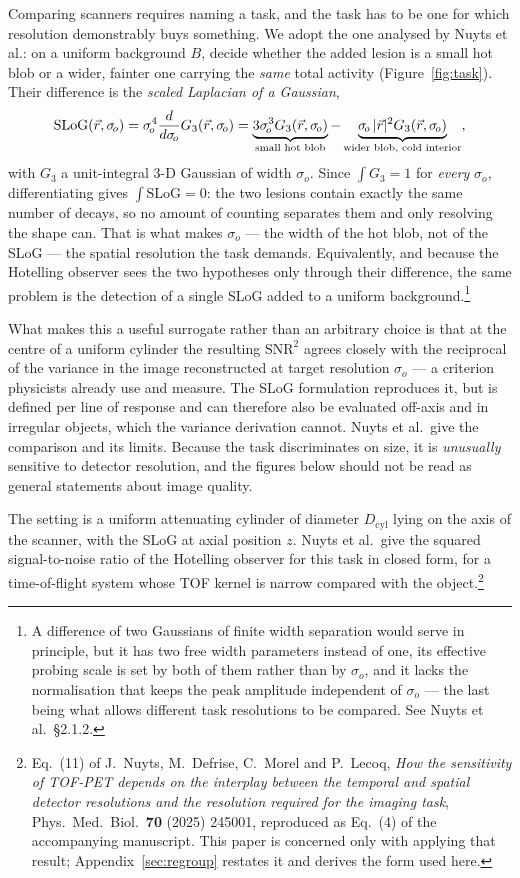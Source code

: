 \documentclass[11pt,a4paper]{article}
\newcommand{\Dcyl}{D_{\mathrm{cyl}}}
\newcommand{\so}{\sigma_{\!o}}
\DeclarePairedDelimiter{\abs}{\lvert}{\rvert}
\begin{document}
Comparing scanners requires naming a task, and the task has to be one for which resolution
demonstrably buys something. We adopt the one analysed by Nuyts et al.: on a uniform
background $B$, decide whether the added lesion is a small hot blob or a wider, fainter one
carrying the \emph{same} total activity (Figure~\ref{fig:task}). Their difference is the
\emph{scaled Laplacian of a Gaussian},
\begin{equation}
  \mathrm{SLoG}(\vec r,\so)=\so^{4}\frac{d}{d\so}G_3(\vec r,\so)
   =\underbrace{3\so^{3}G_3(\vec r,\so)}_{\text{small hot blob}}
    -\underbrace{\so\,\abs{\vec r}^{2}G_3(\vec r,\so)}_{\text{wider blob, cold interior}},
  \label{eq:slog}
\end{equation}
with $G_3$ a unit-integral $3$-D Gaussian of width $\so$. Since $\int G_3=1$ for \emph{every}
$\so$, differentiating gives $\int\mathrm{SLoG}=0$: the two lesions contain exactly the same
number of decays, so no amount of counting separates them and only resolving the shape can.
That is what makes $\so$ --- the width of the hot blob, not of the SLoG --- the spatial
resolution the task demands. Equivalently, and because the Hotelling observer sees the two
hypotheses only through their difference, the same problem is the detection of a single SLoG
added to a uniform background.\footnote{A difference of two Gaussians of finite width
separation would serve in principle, but it has two free width parameters instead of one,
its effective probing scale is set by both of them rather than by $\so$, and it lacks the
normalisation that keeps the peak amplitude independent of $\so$ --- the last being what
allows different task resolutions to be compared. See Nuyts et al.\ \S2.1.2.}

What makes this a useful surrogate rather than an arbitrary choice is that at the centre of a
uniform cylinder the resulting $\mathrm{SNR}^{2}$ agrees closely with the reciprocal of the
variance in the image reconstructed at target resolution $\so$ --- a criterion physicists
already use and measure. The SLoG formulation reproduces it, but is defined per line of
response and can therefore also be evaluated off-axis and in irregular objects, which the
variance derivation cannot. Nuyts et al.\ give the comparison and its limits. Because the
task discriminates on size, it is \emph{unusually} sensitive to detector resolution, and the
figures below should not be read as general statements about image quality.

The setting is a uniform attenuating cylinder of diameter $\Dcyl$ lying on the axis of the
scanner, with the SLoG at axial position $z$. Nuyts et al.\ give the squared signal-to-noise
ratio of the Hotelling observer for this task in closed form, for a time-of-flight system
whose TOF kernel is narrow compared with the object.\footnote{Eq.~(11) of J.~Nuyts,
M.~Defrise, C.~Morel and P.~Lecoq, \emph{How the sensitivity of TOF-PET depends on the
interplay between the temporal and spatial detector resolutions and the resolution required
for the imaging task}, Phys.\ Med.\ Biol.\ \textbf{70} (2025) 245001, reproduced as Eq.~(4)
of the accompanying manuscript. This paper is concerned only with applying that result;
Appendix~\ref{sec:regroup} restates it and derives the form used
here.\label{fn:nuyts}}
\end{document}
